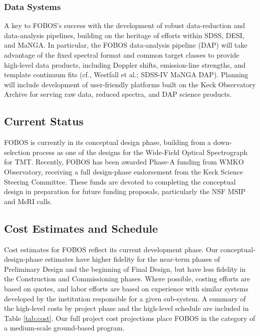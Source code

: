 \subsubsection{Data Systems} A key to FOBOS's success with the
development of robust data-reduction and data-analysis pipelines,
building on the heritage of efforts within SDSS, DESI, and MaNGA. In
particular, the FOBOS data-analysis pipeline (DAP) will take
advantage of the fixed spectral format and common target classes to
provide high-level data products, including Doppler shifts,
emission-line strengths, and template continuum fits (cf., Westfall
et al.; SDSS-IV MaNGA DAP). Planning will include development of
user-friendly platforms built on the Keck Observatory Archive for
serving raw data, reduced spectra, and DAP science products.


\subsection{Current Status} FOBOS is currently in its conceptual design
phase, building from a down-selection process as one of the designs for
the Wide-Field Optical Spectrograph for TMT. Recently, FOBOS has been
awarded Phase-A funding from WMKO Observatory, receiving a full
design-phase endorsement from the Keck Science Steering Committee. These
funds are devoted to completing the conceptual design in preparation for
future funding proposals, particularly the NSF MSIP and MsRI calls.

\subsection{Cost Estimates and Schedule}

Cost estimates for FOBOS reflect its current development phase.  Our
conceptual-design-phase estimates have higher fidelity for the near-term
phases of Preliminary Design and the beginning of Final Design, but have
less fidelity in the Construction and Commissioning phases.  Where
possible, costing efforts are based on quotes, and labor efforts are
based on experience with similar systems developed by the institution
responsible for a given sub-system.  A summary of the high-level costs
by project phase and the high-level schedule are included in Table
\ref{tab:cost}.  Our full project cost projections place FOBOS in the
category of a medium-scale ground-based program. %

